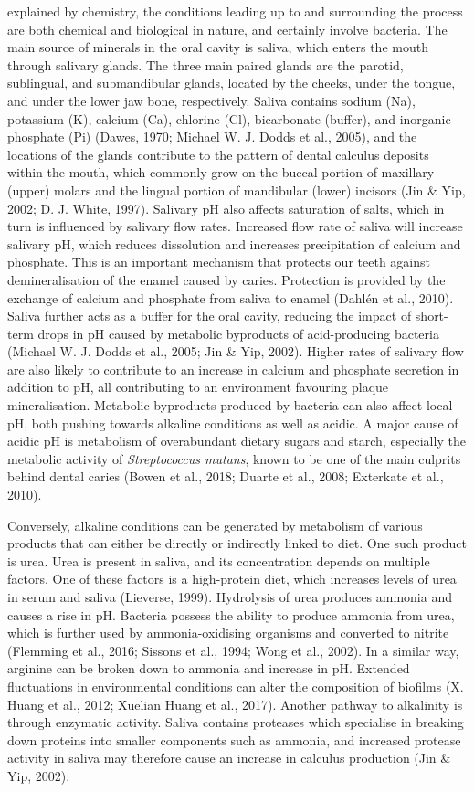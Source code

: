 \documentclass[
  letterpaper,
]{book}
\begin{document}
explained by chemistry, the conditions leading up to and surrounding the
process are both chemical and biological in nature, and certainly
involve bacteria. The main source of minerals in the oral cavity is
saliva, which enters the mouth through salivary glands. The three main
paired glands are the parotid, sublingual, and submandibular glands,
located by the cheeks, under the tongue, and under the lower jaw bone,
respectively. Saliva contains sodium (Na), potassium (K), calcium (Ca),
chlorine (Cl), bicarbonate (buffer), and inorganic phosphate (Pi)
(Dawes, 1970; Michael W. J. Dodds et al., 2005), and the locations of
the glands contribute to the pattern of dental calculus deposits within
the mouth, which commonly grow on the buccal portion of maxillary
(upper) molars and the lingual portion of mandibular (lower) incisors
(Jin \& Yip, 2002; D. J. White, 1997). Salivary pH also affects
saturation of salts, which in turn is influenced by salivary flow rates.
Increased flow rate of saliva will increase salivary pH, which reduces
dissolution and increases precipitation of calcium and phosphate. This
is an important mechanism that protects our teeth against
demineralisation of the enamel caused by caries. Protection is provided
by the exchange of calcium and phosphate from saliva to enamel (Dahlén
et al., 2010). Saliva further acts as a buffer for the oral cavity,
reducing the impact of short-term drops in pH caused by metabolic
byproducts of acid-producing bacteria (Michael W. J. Dodds et al., 2005;
Jin \& Yip, 2002). Higher rates of salivary flow are also likely to
contribute to an increase in calcium and phosphate secretion in addition
to pH, all contributing to an environment favouring plaque
mineralisation. Metabolic byproducts produced by bacteria can also
affect local pH, both pushing towards alkaline conditions as well as
acidic. A major cause of acidic pH is metabolism of overabundant dietary
sugars and starch, especially the metabolic activity of
\emph{Streptococcus mutans}, known to be one of the main culprits behind
dental caries (Bowen et al., 2018; Duarte et al., 2008; Exterkate et
al., 2010).

Conversely, alkaline conditions can be generated by metabolism of
various products that can either be directly or indirectly linked to
diet. One such product is urea. Urea is present in saliva, and its
concentration depends on multiple factors. One of these factors is a
high-protein diet, which increases levels of urea in serum and saliva
(Lieverse, 1999). Hydrolysis of urea produces ammonia and causes a rise
in pH. Bacteria possess the ability to produce ammonia from urea, which
is further used by ammonia-oxidising organisms and converted to nitrite
(Flemming et al., 2016; Sissons et al., 1994; Wong et al., 2002). In a
similar way, arginine can be broken down to ammonia and increase in pH.
Extended fluctuations in environmental conditions can alter the
composition of biofilms (X. Huang et al., 2012; Xuelian Huang et al.,
2017). Another pathway to alkalinity is through enzymatic activity.
Saliva contains proteases which specialise in breaking down proteins
into smaller components such as ammonia, and increased protease activity
in saliva may therefore cause an increase in calculus production (Jin \&
Yip, 2002).
\end{document}
